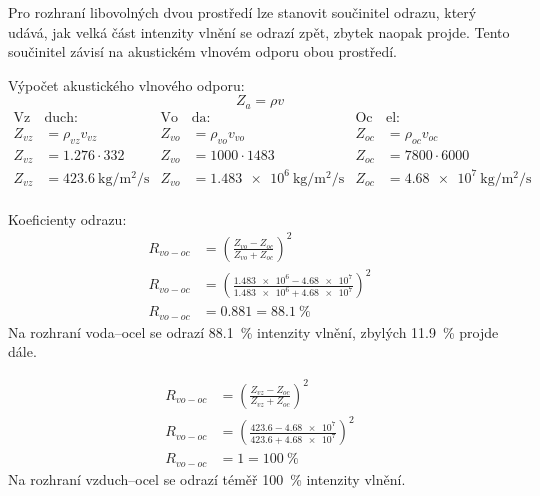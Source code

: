 Pro rozhraní libovolných dvou prostředí lze stanovit součinitel odrazu, který udává, jak velká část intenzity vlnění se odrazí zpět, zbytek naopak projde. 
Tento součinitel závisí na akustickém vlnovém odporu obou prostředí. 

Výpočet akustického vlnového odporu:
\[
    Z_{a} = \rho v
\]
\begin{align*}
  \text{Vz}&\text{duch:} & \text{Vo}&\text{da:} & \text{Oc}&\text{el:} \\
  Z_{vz} &= \rho_{vz} v_{vz} & Z_{vo} &= \rho_{vo} v_{vo} & Z_{oc} &= \rho_{oc} v_{oc} \\
  Z_{vz} &= \num{1,276}\cdot\num{332} & Z_{vo} &= \num{1000}\cdot\num{1483} & Z_{oc} &= \num{7800}\cdot\num{6000} \\
  Z_{vz} &= \qty{423.6}{\kilo\gram\per\square\meter\per\second} & Z_{vo} &= \qty{1.483e6}{\kilo\gram\per\square\meter\per\second} & Z_{oc} &= \qty{4.68e7}{\kilo\gram\per\square\meter\per\second} \\
\end{align*}

Koeficienty odrazu:
\begin{align*}
  R_{vo-oc} &= \left( \frac{Z_{vo}-Z_{oc}}{Z_{vo}+Z_{oc}} \right)^2 \\
  R_{vo-oc} &= \left( \frac{\num{1,483e6}-\num{4,68e7}}{\num{1,483e6}+\num{4,68e7}} \right)^2 \\
  R_{vo-oc} &= \num{0,881} = \qty{88,1}{\percent}  
\end{align*}
Na rozhraní voda--ocel se odrazí \qty{88,1}{\percent} intenzity vlnění, zbylých \qty{11,9}{\percent} projde dále.

\begin{align*}
    R_{vo-oc} &= \left( \frac{Z_{vz}-Z_{oc}}{Z_{vz}+Z_{oc}} \right)^2 \\
    R_{vo-oc} &= \left( \frac{\num{423,6}-\num{4,68e7}}{\num{423,6}+\num{4,68e7}} \right)^2 \\
    R_{vo-oc} &= \num{1} = \qty{100}{\percent}  
\end{align*}
Na rozhraní vzduch--ocel se odrazí téměř \qty{100}{\percent} intenzity vlnění.

